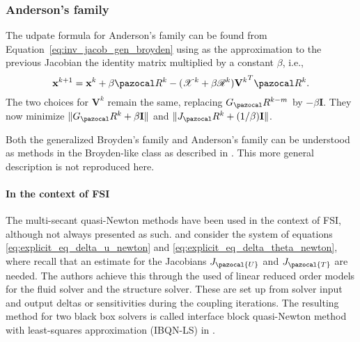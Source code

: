 \subsubsection{Anderson's family}

The udpate formula for Anderson's family can be found from Equation~\eqref{eq:inv_jacob_gen_broyden} using as the approximation to the previous Jacobian the identity matrix multiplied by a constant \(\beta\), i.e.,
\begin{equation} \label{eq:andersons_family_update}
  \mathbf x^{k+1} = \mathbf x^{k} + \beta \pazocal R^k - (\mathscr X^k + \beta\mathscr R^k){\mathbf V^k}^T \pazocal R^k.
\end{equation}
The two choices for \(\mathbf V^k\) remain the same, replacing \(G_\pazocal R^{k-m}\) by \(-\beta\mathbf I\).
They now minimize \(\|G_\pazocal R^k+\beta\mathbf I\|\) and \(\|J_\pazocal R^k + (1/\beta)\mathbf I\|\).

Both the generalized Broyden's family and Anderson's family can be understood as methods in the Broyden-like class as described in \cite{fang_two_2009}.
This more general description is not reproduced here.
%

\paragraph{In the context of FSI}

The multi-secant quasi-Newton methods have been used in the context of FSI, although not always presented as such.
 \cite{vierendeels_implicit_2007} and \cite{degroote_stability_2008} consider the system of equations \eqref{eq:explicit_eq_delta_u_newton} and \eqref{eq:explicit_eq_delta_theta_newton}, where recall that an estimate for the Jacobians \(J_\pazocal{U}\) and \(J_\pazocal{T}\) are needed.
The authors achieve this through the used of linear reduced order models for the fluid solver and the structure solver.
These are set up from solver input and output deltas or sensitivities during the coupling iterations. 
The resulting method for two black box solvers is called interface block quasi-Newton method with least-squares approximation (IBQN-LS) in \cite{degroote_development_2010}.

